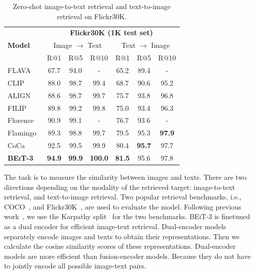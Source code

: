 \documentclass{article}
\newcommand\our{\textsc{BEiT-3}}
\begin{document}
\begin{table}[t]
\centering
\begin{tabular}{@{}l@{\hskip4pt} @{ \hskip4pt}c@{\hskip4pt} @{\hskip4pt}c@{\hskip4pt} @{\hskip4pt}c@{\hskip4pt} @{\hskip4pt}c@{\hskip4pt} @{\hskip4pt}c@{\hskip4pt} @{\hskip4pt}c@{}}
\toprule
\multirow{3}{*}{\bf Model} & \multicolumn{6}{c}{\bf Flickr30K (1K test set)} \\
 & \multicolumn{3}{c}{Image $\rightarrow$ Text} & \multicolumn{3}{c}{Text $\rightarrow$ Image} \\
 \cmidrule(lr){2-4} \cmidrule(lr){5-7}
 & R@1 & R@5 & R@10 & R@1 & R@5 & R@10 \\
\midrule
FLAVA~\citep{flava} & 67.7 & 94.0 & - & 65.2 & 89.4 & - \\
CLIP~\citep{clip} & 88.0 & 98.7 & 99.4 & 68.7 & 90.6 & 95.2 \\
ALIGN~\citep{align} & 88.6 & 98.7 & 99.7 & 75.7 & 93.8 & 96.8 \\
FILIP~\citep{filip} & 89.8 & 99.2 & 99.8 & 75.0 & 93.4 & 96.3 \\
Florence~\citep{florence} & 90.9 & 99.1 & - & 76.7 & 93.6 & - \\
Flamingo~\citep{flamingo} & 89.3 & 98.8 & 99.7 & 79.5 & 95.3 & \bf 97.9 \\
CoCa~\citep{coca} & 92.5 & 99.5 & 99.9 & 80.4 & \bf 95.7 & 97.7 \\
\midrule
\bf \our{} & \bf 94.9 & \bf 99.9 & \bf 100.0 & \bf 81.5 & 95.6 & 97.8 \\
\bottomrule
\end{tabular}
\caption{
Zero-shot image-to-text retrieval and text-to-image retrieval on Flickr30K.
}
\label{tbl:results:zeroshot_retrieval}
\end{table}

The task is to measure the similarity between images and texts.
There are two directions depending on the modality of the retrieved target: image-to-text retrieval, and text-to-image retrieval.
Two popular retrieval benchmarks, i.e., COCO~\citep{coco}, and Flickr30K~\citep{flickr30k}, are used to evaluate the model.
Following previous work~\citep{vinvl,vilt}, we use the Karpathy split~\citep{karpathysplit} for the two benchmarks.
\our{} is finetuned as a dual encoder for efficient image-text retrieval.
Dual-encoder models separately encode images and texts to obtain their representations. Then we calculate the cosine similarity scores of these representations.
Dual-encoder models are more efficient than fusion-encoder models. Because they do not have to jointly encode all possible image-text pairs.
\end{document}
